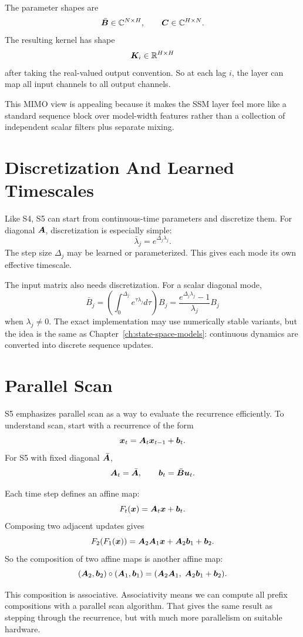 The parameter shapes are
\[
  \bar{\bm{B}}\in\mathbb{C}^{N\times H},
  \qquad
  \bm{C}\in\mathbb{C}^{H\times N}.
\]
The resulting kernel has shape
\[
  \bm{K}_i\in\mathbb{R}^{H\times H}
\]
after taking the real-valued output convention. So at each lag $i$, the layer can map all
input channels to all output channels.

This MIMO view is appealing because it makes the SSM layer feel more like a standard
sequence block over model-width features rather than a collection of independent scalar
filters plus separate mixing.

\section{Discretization And Learned Timescales}

Like S4, S5 can start from continuous-time parameters and discretize them. For diagonal
$\bm{A}$, discretization is especially simple:
\[
  \bar{\lambda}_j = e^{\Delta_j \lambda_j}.
\]
The step size $\Delta_j$ may be learned or parameterized. This gives each mode its own
effective timescale.

The input matrix also needs discretization. For a scalar diagonal mode,
\[
  \bar{B}_j
  =
  \left(\int_0^{\Delta_j} e^{\tau\lambda_j}d\tau\right)B_j
  =
  \frac{e^{\Delta_j\lambda_j}-1}{\lambda_j}B_j
\]
when $\lambda_j\neq 0$. The exact implementation may use numerically stable variants,
but the idea is the same as Chapter~\ref{ch:state-space-models}: continuous dynamics are
converted into discrete sequence updates.

\section{Parallel Scan}

S5 emphasizes parallel scan as a way to evaluate the recurrence efficiently. To understand
scan, start with a recurrence of the form
\[
  \bm{x}_t = \bm{A}_t\bm{x}_{t-1}+\bm{b}_t.
\]
For S5 with fixed diagonal $\bar{\bm{A}}$,
\[
  \bm{A}_t=\bar{\bm{A}},
  \qquad
  \bm{b}_t=\bar{\bm{B}}\bm{u}_t.
\]

Each time step defines an affine map:
\[
  F_t(\bm{x})=\bm{A}_t\bm{x}+\bm{b}_t.
\]
Composing two adjacent updates gives
\[
  F_2(F_1(\bm{x}))
  =
  \bm{A}_2\bm{A}_1\bm{x} + \bm{A}_2\bm{b}_1+\bm{b}_2.
\]
So the composition of two affine maps is another affine map:
\[
  (\bm{A}_2,\bm{b}_2)\circ(\bm{A}_1,\bm{b}_1)
  =
  (\bm{A}_2\bm{A}_1,\; \bm{A}_2\bm{b}_1+\bm{b}_2).
\]

This composition is associative. Associativity means we can compute all prefix
compositions with a parallel scan algorithm. That gives the same result as stepping
through the recurrence, but with much more parallelism on suitable hardware.


